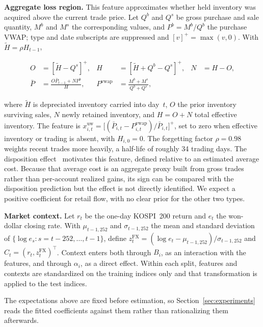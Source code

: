 \documentclass[sigconf,anonymous,review]{acmart}
\begin{document}
\textbf{Aggregate loss region.} This feature approximates whether held
inventory was acquired above the current trade price. Let $Q^b$ and $Q^s$
be gross purchase and sale quantity, $M^b$ and $M^s$ the corresponding
values, and $P^b = M^b / Q^b$ the purchase VWAP; type and date subscripts
are suppressed and $[v]^{+} = \max(v, 0)$. With
$\tilde H = \rho H_{t-1}$,

\begin{equation}
  \begin{aligned}
    O &= [\tilde H - Q^s]^{+}, &
    H &= [\tilde H + Q^b - Q^s]^{+}, &
    N &= H - O, \\
    \bar P &= \frac{O \bar P_{t-1} + N P^b}{H}, &
    P^{\mathrm{vwap}} &= \frac{M^b + M^s}{Q^b + Q^s},
  \end{aligned}
\end{equation}

where $\tilde H$ is depreciated inventory carried into day~$t$, $O$ the
prior inventory surviving sales, $N$ newly retained inventory, and
$H = O + N$ total effective inventory. The feature is
$x^{\mathrm{uw}}_{i,t} = \bigl[(\bar P_{i,t} - P^{\mathrm{vwap}}_{i,t}) /
\bar P_{i,t}\bigr]^{+}$, set to zero when effective inventory or trading
is absent, with $H_{i,0} = 0$. The forgetting factor $\rho = 0.98$
weights recent trades more heavily, a half-life of roughly 34 trading
days. The disposition effect~\cite{shefrin_statman,odean1998} motivates
this feature, defined relative to an estimated average cost. Because that
average cost is an aggregate proxy built from gross trades rather than
per-account realized gains, its sign can be compared with the disposition
prediction but the effect is not directly identified. We expect a
positive coefficient for retail flow, with no clear prior for the other
two types.

\textbf{Market context.} Let $r_t$ be the one-day KOSPI~200 return and
$e_t$ the won-dollar closing rate. With $\mu_{t-1,252}$ and
$\sigma_{t-1,252}$ the mean and standard deviation of
$\{\log e_s : s = t-252, \dots, t-1\}$, define
$z^{\mathrm{FX}}_t = (\log e_t - \mu_{t-1,252}) / \sigma_{t-1,252}$ and
$C_t = (r_t, z^{\mathrm{FX}}_t)^{\top}$. Context enters both through
$B_i$, as an interaction with the features, and through $\alpha_i$, as a
direct effect. Within each split, features and contexts are standardized
on the training indices only and that transformation is applied to the
test indices.

The expectations above are fixed before estimation, so
Section~\ref{sec:experiments} reads the fitted coefficients against them
rather than rationalizing them afterwards.
\end{document}
